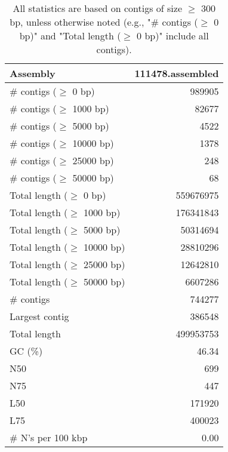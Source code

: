 \documentclass[12pt,a4paper]{article}
\begin{document}
\begin{table}[ht]
\begin{center}
\caption{All statistics are based on contigs of size $\geq$ 300 bp, unless otherwise noted (e.g., "\# contigs ($\geq$ 0 bp)" and "Total length ($\geq$ 0 bp)" include all contigs).}
\begin{tabular}{|l*{1}{|r}|}
\hline
Assembly & 111478.assembled \\ \hline
\# contigs ($\geq$ 0 bp) & 989905 \\ \hline
\# contigs ($\geq$ 1000 bp) & 82677 \\ \hline
\# contigs ($\geq$ 5000 bp) & 4522 \\ \hline
\# contigs ($\geq$ 10000 bp) & 1378 \\ \hline
\# contigs ($\geq$ 25000 bp) & 248 \\ \hline
\# contigs ($\geq$ 50000 bp) & 68 \\ \hline
Total length ($\geq$ 0 bp) & 559676975 \\ \hline
Total length ($\geq$ 1000 bp) & 176341843 \\ \hline
Total length ($\geq$ 5000 bp) & 50314694 \\ \hline
Total length ($\geq$ 10000 bp) & 28810296 \\ \hline
Total length ($\geq$ 25000 bp) & 12642810 \\ \hline
Total length ($\geq$ 50000 bp) & 6607286 \\ \hline
\# contigs & 744277 \\ \hline
Largest contig & 386548 \\ \hline
Total length & 499953753 \\ \hline
GC (\%) & 46.34 \\ \hline
N50 & 699 \\ \hline
N75 & 447 \\ \hline
L50 & 171920 \\ \hline
L75 & 400023 \\ \hline
\# N's per 100 kbp & 0.00 \\ \hline
\end{tabular}
\end{center}
\end{table}
\end{document}
